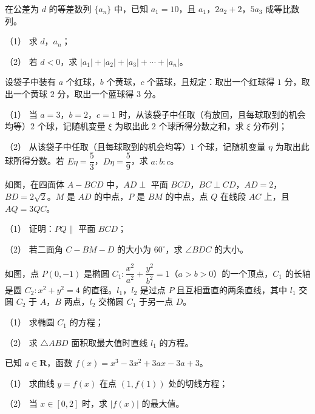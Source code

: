 \begin{question}
在公差为 $d$ 的等差数列 $\{a_n\}$ 中，已知 $a_1=10$，且 $a_1$，$2a_2+2$，$5a_3$ 成等比数列。

（1） 求 $d$，$a_n$；

（2） 若 $d<0$，求 $|a_1|+|a_2|+|a_3|+\cdots+|a_n|$。

\end{question}
\begin{question}
设袋子中装有 $a$ 个红球，$b$ 个黄球，$c$ 个蓝球，且规定：取出一个红球得 $1$ 分，取出一个黄球 $2$ 分，取出一个蓝球得 $3$ 分。

（1） 当 $a=3$，$b=2$，$c=1$ 时，从该袋子中任取（有放回，且每球取到的机会均等）$2$ 个球，记随机变量 $\xi$ 为取出此 $2$ 个球所得分数之和，求 $\xi$ 分布列；

（2） 从该袋子中任取（且每球取到的机会均等）$1$ 个球，记随机变量 $\eta$ 为取出此球所得分数。若 $E\eta=\dfrac53$，$D\eta=\dfrac59$，求 $a:b:c$。

\Needspace{0.4\textheight}
\end{question}
\begin{question}
如图，在四面体 $A-BCD$ 中，$AD\perp$ 平面 $BCD$，$BC\perp CD$，$AD=2$，$BD=2\sqrt2$。$M$ 是 $AD$ 的中点，$P$ 是 $BM$ 的中点，点 $Q$ 在线段 $AC$ 上，且 $AQ=3QC$。

（1） 证明：$PQ\parallel$ 平面 $BCD$；

（2） 若二面角 $C-BM-D$ 的大小为 $60^\circ$，求 $\angle BDC$ 的大小。
\nopagebreak[4]
\begin{center}\end{center}
\nopagebreak[4]
\Needspace{0.4\textheight}
\end{question}
\begin{question}
如图，点 $P(0,-1)$ 是椭圆 $C_1:\dfrac{x^2}{a^2}+\dfrac{y^2}{b^2}=1$（$a>b>0$）的一个顶点，$C_1$ 的长轴是圆 $C_2:x^2+y^2=4$ 的直径。$l_1$，$l_2$ 是过点 $P$ 且互相垂直的两条直线，其中 $l_1$ 交圆 $C_2$ 于 $A$，$B$ 两点，$l_2$ 交椭圆 $C_1$ 于另一点 $D$。

（1） 求椭圆 $C_1$ 的方程；

（2） 求 $\triangle ABD$ 面积取最大值时直线 $l_1$ 的方程。
\nopagebreak[4]
\begin{center}\end{center}
\nopagebreak[4]
\end{question}
\begin{question}
已知 $a\in\mathbf R$，函数 $f(x)=x^3-3x^2+3ax-3a+3$。

（1） 求曲线 $y=f(x)$ 在点 $(1,f(1))$ 处的切线方程；

（2） 当 $x\in[0,2]$ 时，求 $|f(x)|$ 的最大值。

\end{question}